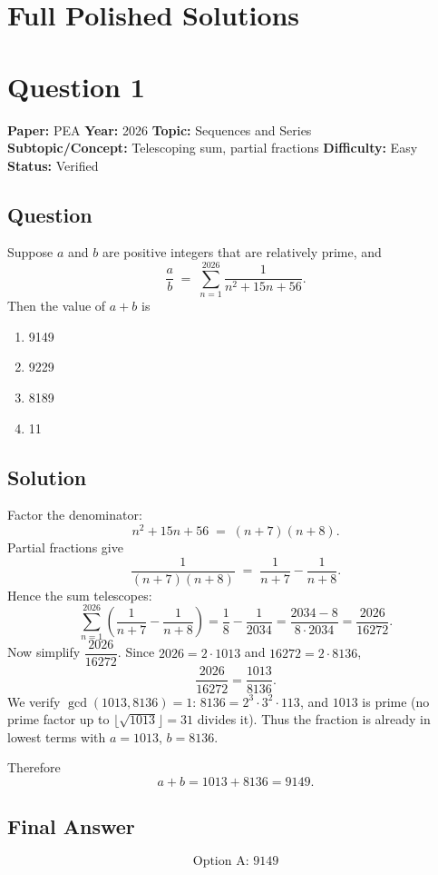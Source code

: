 \documentclass[11pt]{article}
\begin{document}
\newpage

\section*{Full Polished Solutions}

\section*{Question 1}
\textbf{Paper:} PEA \quad \textbf{Year:} 2026 \quad \textbf{Topic:} Sequences and Series \\
\textbf{Subtopic/Concept:} Telescoping sum, partial fractions \quad
\textbf{Difficulty:} Easy \quad \textbf{Status:} Verified

\subsection*{Question}
Suppose $a$ and $b$ are positive integers that are relatively prime, and
\[
\frac{a}{b} \;=\; \sum_{n=1}^{2026} \frac{1}{n^2 + 15n + 56}.
\]
Then the value of $a+b$ is
\begin{enumerate}[label=(\Alph*)]
\item 9149 \item 9229 \item 8189 \item 11
\end{enumerate}

\subsection*{Solution}
Factor the denominator:
\[
n^2 + 15n + 56 \;=\; (n+7)(n+8).
\]
Partial fractions give
\[
\frac{1}{(n+7)(n+8)} \;=\; \frac{1}{n+7} - \frac{1}{n+8}.
\]
Hence the sum telescopes:
\[
\sum_{n=1}^{2026}\left(\frac{1}{n+7} - \frac{1}{n+8}\right)
= \frac{1}{8} - \frac{1}{2034}
= \frac{2034 - 8}{8 \cdot 2034}
= \frac{2026}{16272}.
\]
Now simplify $\dfrac{2026}{16272}$. Since $2026 = 2 \cdot 1013$ and $16272 = 2 \cdot 8136$,
\[
\frac{2026}{16272} = \frac{1013}{8136}.
\]
We verify $\gcd(1013, 8136)=1$: $8136 = 2^3 \cdot 3^2 \cdot 113$, and $1013$ is prime
(no prime factor up to $\lfloor\sqrt{1013}\rfloor = 31$ divides it). Thus the fraction
is already in lowest terms with $a = 1013$, $b = 8136$.

Therefore
\[
a + b = 1013 + 8136 = 9149.
\]

\subsection*{Final Answer}
\[
\boxed{\text{Option A: } 9149}
\]
\end{document}
